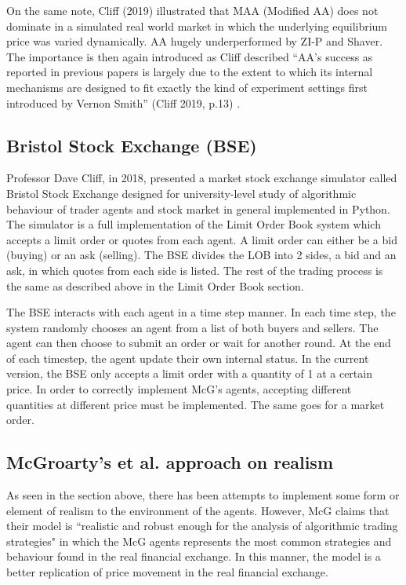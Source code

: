 On the same note, Cliff (2019) illustrated that MAA (Modified AA) does not dominate in a simulated real world market in which the underlying equilibrium price was varied dynamically. AA hugely underperformed by ZI-P and Shaver. The importance is then again introduced as Cliff described ``AA’s success as reported in previous papers is largely due to the extent to which its internal mechanisms are designed to fit exactly the kind of experiment settings first introduced by Vernon Smith” (Cliff 2019, p.13) \cite{dcliff2013}. 

\subsection{Bristol Stock Exchange (BSE)}
Professor Dave Cliff, in 2018, presented a market stock exchange simulator called Bristol Stock Exchange designed for university-level study of algorithmic behaviour of trader agents and stock market in general implemented in Python. The simulator is a full implementation of the Limit Order Book system which accepts a limit order or quotes from each agent. A limit order can either be a bid (buying) or an ask (selling). The BSE divides the LOB into 2 sides, a bid and an ask, in which quotes from each side is listed. The rest of the trading process is the same as described above in the Limit Order Book section. 

The BSE interacts with each agent in a time step manner. In each time step, the system randomly chooses an agent from a list of both buyers and sellers. The agent can then choose to submit an order or wait for another round. At the end of each timestep, the agent update their own internal status. In the current version, the BSE only accepts a limit order with a quantity of 1 at a certain price. In order to correctly implement McG’s agents, accepting different quantities at different price must be implemented. The same goes for a market order. 

\subsection{McGroarty's et al. approach on realism}
As seen in the section above, there has been attempts to implement some form or element of realism to the environment of the agents. However, McG claims that their model is ``realistic and robust enough for the analysis of algorithmic trading strategies"\cite{McGroarty} in which the McG agents represents the most common strategies and behaviour found in the real financial exchange. In this manner, the model is a better replication of price movement in the real financial exchange. 

